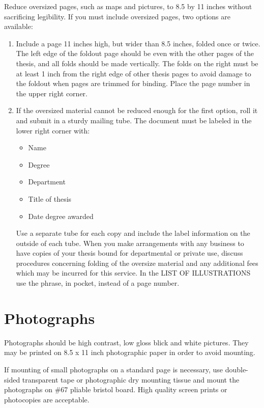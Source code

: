 \documentclass[draft]{ua-thesis}
\begin{document}
Reduce oversized pages, such as maps and pictures, to 8.5 by 11 inches
without sacrificing legibility. If you must include oversized pages, two
options are available:
\begin{enumerate}
  \item Include a page 11 inches high, but wider than 8.5 inches, folded once
     or twice. The left edge of the foldout page should be even with the
     other pages of the thesis, and all folds should be made vertically. The
     folds on the right must be at least 1 inch from the right edge of other
     thesis pages to avoid damage to the foldout when pages are trimmed for
     binding. Place the page number in the upper right corner.

  \item If the oversized material cannot be reduced enough for the first
     option, roll it and submit in a sturdy mailing tube. The document must
     be labeled in the lower right corner with:
     \begin{itemize}
          \item Name
          \item Degree
          \item Department
          \item Title of thesis
          \item Date degree awarded
     \end{itemize}
     Use a separate tube for each copy and include the label information on
     the outside of each tube. When you make arrangements with any business
     to have copies of your thesis bound for departmental or private use,
     discuss procedures concerning folding of the oversize material and any
     additional fees which may be incurred for this service. In the LIST OF
     ILLUSTRATIONS use the phrase, in pocket, instead of a page number.
\end{enumerate}

\chapter{Photographs}

Photographs should be high contrast, low gloss blick and white pictures.
They may be printed on 8.5 x 11 inch photographic paper in order to avoid
mounting.

If mounting of small photographs on a standard page is necessary, use
double-sided transparent tape or photographic dry mounting tissue and mount
the photographs on \#67 pliable bristol board. High quality screen prints
or photocopies are acceptable.
\end{document}
